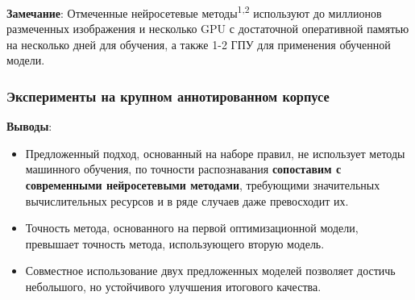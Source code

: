 \begin{frame}
    \textbf{Замечание}: Отмеченные нейросетевые методы\textsuperscript{1,2} используют до миллионов размеченных изображения и несколько GPU с достаточной оперативной памятью на несколько дней для обучения, а также 1-2 ГПУ для применения обученной модели.

\end{frame}

\begin{frame}
    \frametitle{Эксперименты на крупном аннотированном корпусе}
    \textbf{Выводы}:
    \begin{itemize}
        \item Предложенный подход, основанный на наборе правил, не использует методы машинного обучения, по точности распознавания \textbf{сопоставим с современными нейросетевыми методами}, требующими значительных вычислительных ресурсов и в ряде случаев даже превосходит их.
        \item Точность метода, основанного на первой оптимизационной модели, превышает точность метода, использующего вторую модель.
        \item Совместное использование двух предложенных моделей позволяет достичь небольшого, но устойчивого улучшения итогового качества.
    \end{itemize}
\end{frame}






